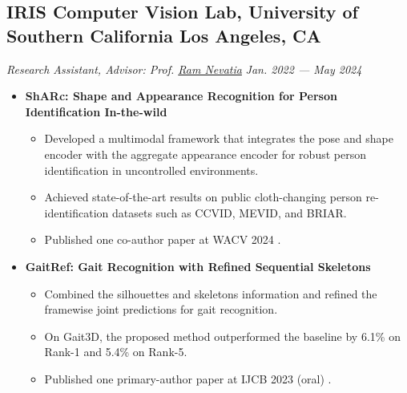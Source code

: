 \documentclass[a4,10pt]{article}
\newcommand{\subtext}[1]{
#1\par\vspace{-0.2cm}}
\newenvironment{zitemize}{
\begin{itemize}\itemsep0pt \parskip0pt \parsep1pt}
{\end{itemize}\vspace{-0.5cm}}
\begin{document}
\subsection*{IRIS Computer Vision Lab, University of Southern California \hfill Los Angeles, CA}
\subtext{\textit{Research Assistant, Advisor: Prof. \href{https://sites.usc.edu/iris-cvlab/professor-ram-nevatia/} {Ram Nevatia} }\hfill \textit{Jan. 2022 --- May 2024}}
    \begin{zitemize}
    
        \item \textbf{ShARc: Shape and Appearance Recognition for Person Identification In-the-wild}
            \begin{itemize}
                \item Developed a multimodal framework that integrates the pose and shape encoder with the aggregate appearance encoder for robust person identification in uncontrolled environments.
                \item Achieved state-of-the-art results on public cloth-changing person re-identification datasets such as CCVID, MEVID, and BRIAR.
                \item Published one co-author paper at WACV 2024 \cite{Pap4}.
            \end{itemize}
            
        \item \textbf{GaitRef: Gait Recognition with Refined Sequential Skeletons}
            \begin{itemize}
                \item Combined the silhouettes and skeletons information and refined the framewise joint predictions for gait recognition.
                \item On Gait3D, the proposed method outperformed the baseline by 6.1\% on Rank-1 and 5.4\% on Rank-5.
                \item Published one primary-author paper at IJCB 2023 (oral) \cite{Pap3}.
            \end{itemize}

        \end{zitemize}
        
\end{document}
